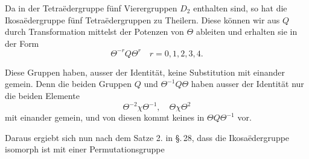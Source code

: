 Da in der Tetra\"edergruppe fünf Vierergruppen $D_2$ enthalten sind, so hat die Ikosa\"edergruppe fünf Tetra\"edergruppen zu Theilern. %
Diese können wir aus $Q$ durch Transformation mittelst der Potenzen von $\Theta$ ableiten und erhalten sie in der Form
\[
\Theta^{-r}Q\Theta^r \quad r=0,1,2,3,4.
\]

Diese Gruppen haben, ausser der Identität, keine Substitution mit einander gemein. Denn die beiden Gruppen $Q$ und $\Theta^{-1}Q\Theta$ haben ausser der Identität nur die beiden Elemente
\[
\Theta^{-2}\chi\Theta^{-1}, \quad \Theta\chi\Theta^2
\]
mit einander gemein, und von diesen kommt keines in $\Theta Q\Theta^{-1}$ vor.

Daraus ergiebt sich nun nach dem Satze 2. in \S.\,28, dass die Ikosa\"edergruppe isomorph ist mit einer Permutationsgruppe
